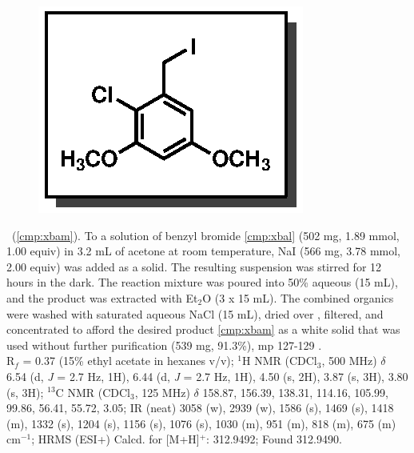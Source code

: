 \vspace{10pt}
\begin{figure}
  \vspace{-25pt}
  \begin{center}
    \includegraphics[scale=0.8]{chp_singlecarbon/images/xbam}
  \end{center}
  \vspace{-30pt}
\end{figure}\noindent \textbf{\CMPxbam}\ (\ref{cmp:xbam}). To a solution
of benzyl bromide \ref{cmp:xbal} (502 mg, 1.89 mmol, 1.00 equiv) in 3.2 mL of
acetone at room temperature, NaI (566 mg, 3.78 mmol, 2.00 equiv) was
added as a solid. The resulting suspension was stirred for 12 hours in the
dark. The reaction mixture was poured into 50\% aqueous  (15 mL), and the product was
extracted with Et$_2$O (3 x 15 mL). The combined organics were washed with saturated aqueous
NaCl (15 mL), dried over , filtered, and concentrated to afford the desired product
\ref{cmp:xbam} as a white solid that was used without further purification (539 mg, 91.3\%), mp
127-129 \degc.\\
R$_f$ = 0.37 (15\% ethyl acetate in hexanes v/v); $^1$H NMR (CDCl$_3$, 500 MHz) $\delta$ 6.54 (d, \textit{J} = 2.7 Hz, 1H),
6.44 (d, \textit{J} = 2.7 Hz, 1H), 4.50 (s, 2H), 3.87 (s, 3H), 3.80 (s, 3H);
$^{13}$C NMR (CDCl$_3$, 125 MHz) $\delta$ 158.87, 156.39, 138.31, 114.16, 105.99, 99.86, 56.41,
55.72, 3.05; IR (neat) 3058 (w), 2939 (w), 1586 (s), 1469 (s), 1418 (m), 1332 (s), 1204 (s), 1156 (s), 1076 (s), 1030 (m), 951 (m),
818 (m), 675 (m) cm$^{-1}$; HRMS (ESI+) Calcd. for  [M+H]$^+$: 312.9492; Found
312.9490.

